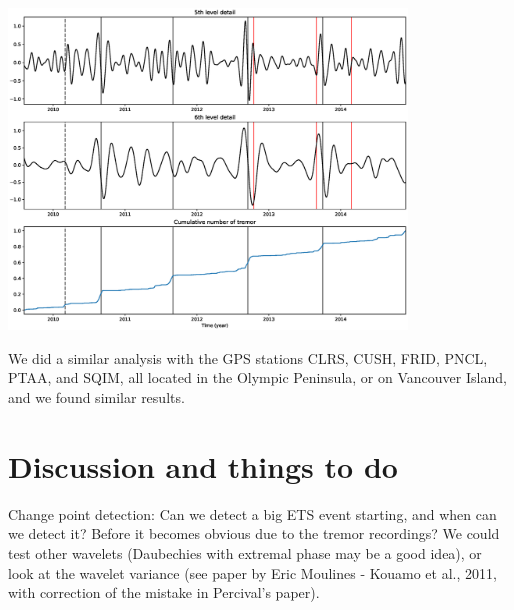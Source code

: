 \documentclass[main.tex]{subfiles}
\begin{document}
\begin{center}
\includegraphics[width=300pt]{Figures/slowslip_results/Figure_4.eps}
\captionsetup{type=figure}
\end{center}

We did a similar analysis with the GPS stations CLRS, CUSH, FRID, PNCL, PTAA, and SQIM, all located in the Olympic Peninsula, or on Vancouver Island, and we found similar results.

\chapter{Discussion and things to do}

Change point detection: Can we detect a big ETS event starting, and when can we detect it? Before it becomes obvious due to the tremor recordings? We could test other wavelets (Daubechies with extremal phase may be a good idea), or look at the wavelet variance (see paper by Eric Moulines - Kouamo et al., 2011, with correction of the mistake in Percival's paper).
\end{document}
